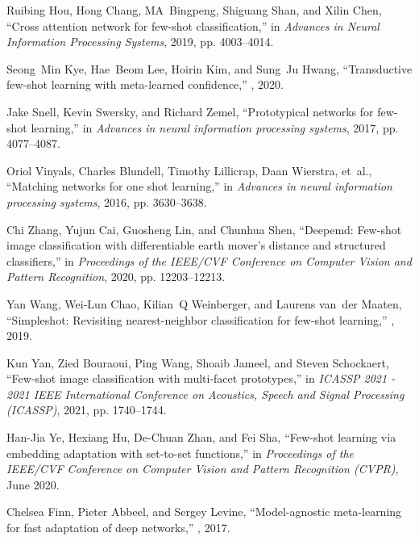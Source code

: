\documentclass{article}
\begin{document}
\begin{thebibliography}{10}

Ruibing Hou, Hong Chang, MA~Bingpeng, Shiguang Shan, and Xilin Chen,
\newblock ``Cross attention network for few-shot classification,''
\newblock in {\em Advances in Neural Information Processing Systems}, 2019, pp.
  4003--4014.

Seong~Min Kye, Hae~Beom Lee, Hoirin Kim, and Sung~Ju Hwang,
\newblock ``Transductive few-shot learning with meta-learned confidence,''
, 2020.

Jake Snell, Kevin Swersky, and Richard Zemel,
\newblock ``Prototypical networks for few-shot learning,''
\newblock in {\em Advances in neural information processing systems}, 2017, pp.
  4077--4087.

Oriol Vinyals, Charles Blundell, Timothy Lillicrap, Daan Wierstra, et~al.,
\newblock ``Matching networks for one shot learning,''
\newblock in {\em Advances in neural information processing systems}, 2016, pp.
  3630--3638.

Chi Zhang, Yujun Cai, Guosheng Lin, and Chunhua Shen,
\newblock ``Deepemd: Few-shot image classification with differentiable earth
  mover's distance and structured classifiers,''
\newblock in {\em Proceedings of the IEEE/CVF Conference on Computer Vision and
  Pattern Recognition}, 2020, pp. 12203--12213.

Yan Wang, Wei-Lun Chao, Kilian~Q Weinberger, and Laurens van~der Maaten,
\newblock ``Simpleshot: Revisiting nearest-neighbor classification for few-shot
  learning,''
, 2019.

Kun Yan, Zied Bouraoui, Ping Wang, Shoaib Jameel, and Steven Schockaert,
\newblock ``Few-shot image classification with multi-facet prototypes,''
\newblock in {\em ICASSP 2021 - 2021 IEEE International Conference on
  Acoustics, Speech and Signal Processing (ICASSP)}, 2021, pp. 1740--1744.

Han-Jia Ye, Hexiang Hu, De-Chuan Zhan, and Fei Sha,
\newblock ``Few-shot learning via embedding adaptation with set-to-set
  functions,''
\newblock in {\em Proceedings of the IEEE/CVF Conference on Computer Vision and
  Pattern Recognition (CVPR)}, June 2020.

Chelsea Finn, Pieter Abbeel, and Sergey Levine,
\newblock ``Model-agnostic meta-learning for fast adaptation of deep
  networks,''
, 2017.


\end{thebibliography}
\end{document}
